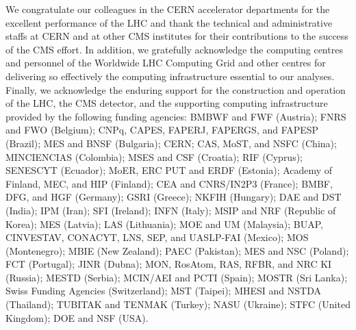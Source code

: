 \documentclass[11pt,twoside,a4paper]{cms-tdr}
\begin{document}
\begin{itemize}
    We congratulate our colleagues in the CERN accelerator departments for the excellent performance of the LHC and thank the technical and administrative staffs at CERN and at other CMS institutes for their contributions to the success of the CMS effort. In addition, we gratefully acknowledge the computing centres and personnel of the Worldwide LHC Computing Grid and other centres for delivering so effectively the computing infrastructure essential to our analyses. Finally, we acknowledge the enduring support for the construction and operation of the LHC, the CMS detector, and the supporting computing infrastructure provided by the following funding agencies: BMBWF and FWF (Austria); FNRS and FWO (Belgium); CNPq, CAPES, FAPERJ, FAPERGS, and FAPESP (Brazil); MES and BNSF (Bulgaria); CERN; CAS, MoST, and NSFC (China); MINCIENCIAS (Colombia); MSES and CSF (Croatia); RIF (Cyprus); SENESCYT (Ecuador); MoER, ERC PUT and ERDF (Estonia); Academy of Finland, MEC, and HIP (Finland); CEA and CNRS/IN2P3 (France); BMBF, DFG, and HGF (Germany); GSRI (Greece); NKFIH (Hungary); DAE and DST (India); IPM (Iran); SFI (Ireland); INFN (Italy); MSIP and NRF (Republic of Korea); MES (Latvia); LAS (Lithuania); MOE and UM (Malaysia); BUAP, CINVESTAV, CONACYT, LNS, SEP, and UASLP-FAI (Mexico); MOS (Montenegro); MBIE (New Zealand); PAEC (Pakistan); MES and NSC (Poland); FCT (Portugal); JINR (Dubna); MON, RosAtom, RAS, RFBR, and NRC KI (Russia); MESTD (Serbia); MCIN/AEI and PCTI (Spain); MOSTR (Sri Lanka); Swiss Funding Agencies (Switzerland); MST (Taipei); MHESI and NSTDA (Thailand); TUBITAK and TENMAK (Turkey); NASU (Ukraine); STFC (United Kingdom); DOE and NSF (USA).


\end{itemize}
\end{document}
